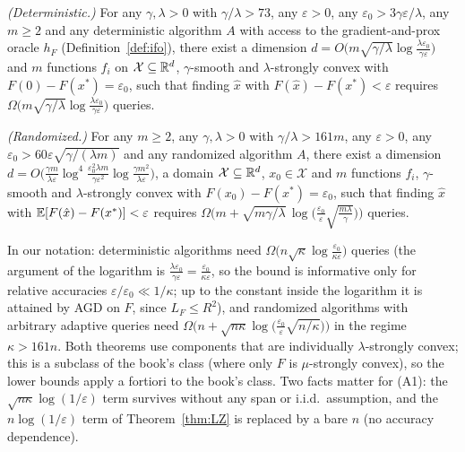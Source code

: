 \begin{theorem}
\label{thm:WS}
\emph{(Deterministic.)} For any $\gamma,\lambda>0$ with $\gamma/\lambda>73$, any $\varepsilon>0$, any $\varepsilon_0>3\gamma\varepsilon/\lambda$, any $m\ge2$ and any deterministic algorithm $A$ with access to the gradient-and-prox oracle $h_F$ (Definition~\ref{def:ifo}), there exist a dimension $d=O\big(m\sqrt{\gamma/\lambda}\log\frac{\lambda\varepsilon_0}{\gamma\varepsilon}\big)$ and $m$ functions $f_i$ on $\mathcal X\subseteq\mathbb{R}^d$, $\gamma$-smooth and $\lambda$-strongly convex with $F(0)-F(x^\ast)=\varepsilon_0$, such that finding $\hat x$ with $F(\hat x)-F(x^\ast)<\varepsilon$ requires $\Omega\big(m\sqrt{\gamma/\lambda}\log\frac{\lambda\varepsilon_0}{\gamma\varepsilon}\big)$ queries.

\emph{(Randomized.)} For any $m\ge2$, any $\gamma,\lambda>0$ with $\gamma/\lambda>161m$, any $\varepsilon>0$, any $\varepsilon_0>60\varepsilon\sqrt{\gamma/(\lambda m)}$ and any randomized algorithm $A$, there exist a dimension $d=O\big(\frac{\gamma m}{\lambda\varepsilon}\log^4\frac{\varepsilon_0^2\lambda m}{\gamma\varepsilon^2}$\allowbreak$\log\frac{\gamma m^2}{\lambda\varepsilon}\big)$, a domain $\mathcal X\subseteq\mathbb{R}^d$, $x_0\in\mathcal X$ and $m$ functions $f_i$, $\gamma$-smooth and $\lambda$-strongly convex with $F(x_0)-F(x^\ast)=\varepsilon_0$, such that finding $\hat x$ with $\mathbb{E}[F(\hat x)-F(x^\ast)]<\varepsilon$ requires $\Omega\big(m+\sqrt{m\gamma/\lambda}\,\log\big(\frac{\varepsilon_0}{\varepsilon}\sqrt{\frac{m\lambda}{\gamma}}\big)\big)$ queries.
\end{theorem}

In our notation: deterministic algorithms need $\Omega\big(n\sqrt\kappa\log\frac{\varepsilon_0}{\kappa\varepsilon}\big)$ queries (the argument of the logarithm is $\frac{\lambda\varepsilon_0}{\gamma\varepsilon}=\frac{\varepsilon_0}{\kappa\varepsilon}$, so the bound is informative only for relative accuracies $\varepsilon/\varepsilon_0\ll1/\kappa$; up to the constant inside the logarithm it is attained by AGD on $F$, since $L_F\le R^2$), and randomized algorithms with arbitrary adaptive queries need $\Omega\big(n+\sqrt{n\kappa}\log\big(\frac{\varepsilon_0}{\varepsilon}\sqrt{n/\kappa}\big)\big)$ in the regime $\kappa>161n$. Both theorems use components that are individually $\lambda$-strongly convex; this is a subclass of the book's class (where only $F$ is $\mu$-strongly convex), so the lower bounds apply a fortiori to the book's class. Two facts matter for (A1): the $\sqrt{n\kappa}\log(1/\varepsilon)$ term survives without any span or i.i.d.\ assumption, and the $n\log(1/\varepsilon)$ term of Theorem~\ref{thm:LZ} is replaced by a bare $n$ (no accuracy dependence).

